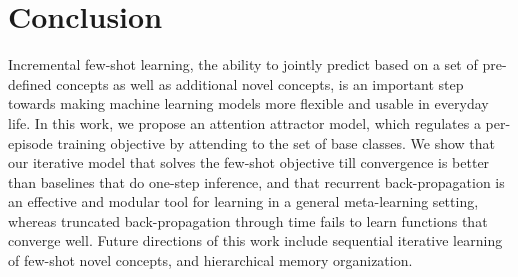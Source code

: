 \section{Conclusion}
Incremental few-shot learning, the ability to jointly predict based on a set of pre-defined concepts
as well as additional novel concepts, is an important step towards making machine learning models
more flexible and usable in everyday life. In this work, we propose an attention attractor model,
which regulates a per-episode training objective by attending to the set of base classes. We show
that our iterative model that solves the few-shot objective till convergence is better than
baselines that do one-step inference, and that recurrent back-propagation is an effective and
modular tool for learning in a general meta-learning setting, whereas truncated back-propagation
through time fails to learn functions that converge well. %
Future directions of this work include sequential iterative
learning of few-shot novel concepts, and hierarchical memory organization.
